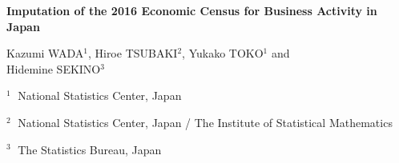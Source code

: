\documentclass[12pt]{article}
\begin{document}
\begin{flushleft}


{\LARGE\bf Imputation of the 2016 Economic Census for Business Activity in Japan}


\vspace{1.0cm}

Kazumi WADA$^1$, Hiroe TSUBAKI$^2$, Yukako TOKO$^1$ and \\ Hidemine SEKINO$^3$

\begin{description}

\item $^1 \;$ National Statistics Center, Japan

\item $^2 \;$ National Statistics Center, Japan / The Institute of Statistical Mathematics

\item $^3 \;$ The Statistics Bureau, Japan

\end{description}

\end{flushleft}


\vspace{0.75cm}
\end{document}
